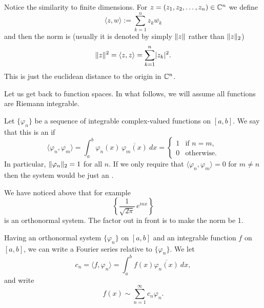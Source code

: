 \begin{remark}
Notice the similarity to finite dimensions.  For $z = (z_1,z_2,\ldots,z_n) \in 
{\mathbb{C}}^n$ we define 
\begin{equation*}
\langle z , w \rangle :=
\sum_{k=1}^n z_k \overline{w_k}
\end{equation*}
and then the norm is (usually it is denoted by simply $\lVert {z} \rVert$ rather than
$\lVert {z} \rVert_2$)
\begin{equation*}
\lVert {z} \rVert^2 = 
\langle z , z \rangle =
\sum_{k=1}^n \lvert {z_k} \rvert^2 .
\end{equation*}
This is just the euclidean distance to the origin in ${\mathbb{C}}^n$.
\end{remark}

Let us get back to function spaces.  In what follows, we will
assume all functions are Riemann integrable.

\begin{defn}
Let $\{ \varphi_n \}$ be a sequence of integrable complex-valued
functions on $[a,b]$.  We say that this is an
\emph{} if
\begin{equation*}
\langle \varphi_n , \varphi_m \rangle
=
\int_a^b \varphi_n(x) \, \overline{\varphi_m(x)} ~ dx
= 
\begin{cases}
1 & \text{if $n=m$,} \\
0 & \text{otherwise.}
\end{cases}
\end{equation*}
In particular, $\lVert {\varphi_n} \rVert_2 = 1$ for all $n$.  If we
only require that 
$\langle \varphi_n , \varphi_m \rangle = 0$ for $m\not= n$ then
the system would be just an \emph{}.
\end{defn}

We have noticed above that for example
\begin{equation*}
\left\{ \frac{1}{\sqrt{2\pi}} \, e^{inx} \right\}
\end{equation*}
is an orthonormal system.  The factor out in front is to make the norm be 1.

Having an orthonormal system $\{ \varphi_n \}$ on $[a,b]$ and an integrable function $f$
on $[a,b]$, we can write
a Fourier series relative to $\{ \varphi_n \}$.  We let
\begin{equation*}
c_n =
\langle f , \varphi_n \rangle
=
\int_a^b f(x) \overline{\varphi_n(x)} ~ dx ,
\end{equation*}
and write
\begin{equation*}
f(x) \sim \sum_{n=1}^\infty c_n \varphi_n .
\end{equation*}

